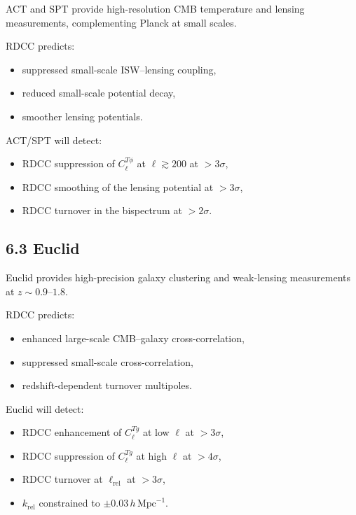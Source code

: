 \documentclass[11pt,a4paper]{article}
\begin{document}
ACT and SPT provide high-resolution CMB temperature and lensing measurements, complementing 
Planck at small scales.

RDCC predicts:

\begin{itemize}
    \item suppressed small-scale ISW–lensing coupling,
    \item reduced small-scale potential decay,
    \item smoother lensing potentials.
\end{itemize}

ACT/SPT will detect:

\begin{itemize}
    \item RDCC suppression of $C_{\ell}^{T\phi}$ at $\ell \gtrsim 200$ at $>3\sigma$,
    \item RDCC smoothing of the lensing potential at $>3\sigma$,
    \item RDCC turnover in the bispectrum at $>2\sigma$.
\end{itemize}

\subsection*{6.3 Euclid}

Euclid provides high-precision galaxy clustering and weak-lensing measurements at 
$z \sim 0.9$–$1.8$.

RDCC predicts:

\begin{itemize}
    \item enhanced large-scale CMB–galaxy cross-correlation,
    \item suppressed small-scale cross-correlation,
    \item redshift-dependent turnover multipoles.
\end{itemize}

Euclid will detect:

\begin{itemize}
    \item RDCC enhancement of $C_{\ell}^{Tg}$ at low $\ell$ at $>3\sigma$,
    \item RDCC suppression of $C_{\ell}^{Tg}$ at high $\ell$ at $>4\sigma$,
    \item RDCC turnover at $\ell_{\mathrm{rel}}$ at $>3\sigma$,
    \item $k_{\mathrm{rel}}$ constrained to $\pm 0.03\,h\,\mathrm{Mpc}^{-1}$.
\end{itemize}
\end{document}
